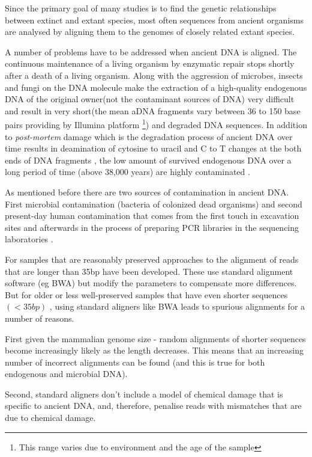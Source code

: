 \documentclass[11pt,a4paper]{report}
\begin{document}
Since the primary goal of many studies is to find the genetic relationships between extinct and extant species, 
most often sequences from ancient organisms are analysed by aligning them to the genomes of closely related extant species\cite{Neanthertal}\cite{AncientDNA}.

A number of problems have to be addressed when ancient DNA is aligned.
The continuous maintenance of a living organism by enzymatic repair stops shortly 
after a death of a living organism. Along with the aggression of microbes,
insects and fungi on the DNA molecule make the extraction of a high-quality 
endogenous DNA of the original owner(not the contaminant sources of DNA) 
very difficult and result in very short(the mean aDNA fragments vary between 
36 to 150 base pairs providing by Illumina platform\cite{rizzi2012ancient} 
\footnote{This range varies due to environment and the age of the sample})
 and degraded DNA sequences\cite{paabo2004genetic}.
In addition to \emph{post-mortem} damage which is the degradation process of
ancient DNA over time results in deamination of cytosine to uracil and C to T 
changes at the both ends of DNA fragments \cite{futureofaDNA}, the low amount 
of survived endogenous DNA over a long period of time (above 38,000 years) 
are highly contaminated \cite{paabo2004genetic}\cite{aDNA}.

As mentioned before there are two sources of contamination in ancient DNA.
First microbial contamination (bacteria of colonized dead organisms) and second present-day human contamination that comes from the first touch in excavation sites and afterwards in the process of preparing PCR libraries in the sequencing laboratories \cite{AncientDNA}.

For samples that are reasonably preserved approaches to the alignment of reads that are longer than 35bp have been developed. 
These use standard alignment software (eg BWA) but modify the parameters to compensate more differences.
But for older or less well-preserved samples that have even shorter sequences $(<35 bp)$ \cite{meyer2014mitochondrial},
using standard aligners like BWA leads to spurious alignments for a number of reasons.

First given the mammalian genome size - random alignments of shorter sequences become increasingly likely as the length decreases. This means that an increasing number of incorrect alignments can be found (and this is true for both endogenous and microbial DNA).

Second, standard aligners don't include a model of chemical damage that is specific to ancient DNA, and, therefore, penalise reads with mismatches that are due to chemical damage.
\end{document}
